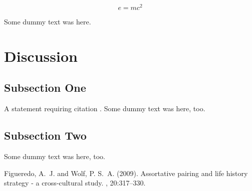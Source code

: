 \documentclass[twoside,twocolumn]{article}
\begin{document}
\begin{equation}
\label{eq:emc}
e = mc^2
\end{equation}

Some dummy text was here.


\section{Discussion}

\subsection{Subsection One}

A statement requiring citation \cite{Figueredo:2009dg}.
Some dummy text was here, too.

\subsection{Subsection Two}

Some dummy text was here, too.


\begin{thebibliography}{99} %

Figueredo, A.~J. and Wolf, P. S.~A. (2009).
\newblock Assortative pairing and life history strategy - a cross-cultural
  study.
, 20:317--330.
 
\end{thebibliography}

\end{document}
